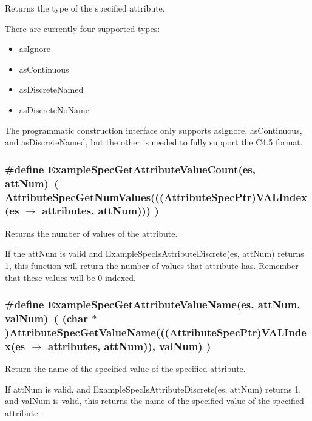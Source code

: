 Returns the type of the specified attribute. 

There are currently four supported types:\begin{itemize}
\item as\-Ignore\item as\-Continuous\item as\-Discrete\-Named\item as\-Discrete\-No\-Name\end{itemize}


The programmatic construction interface only supports as\-Ignore, as\-Continuous, and as\-Discrete\-Named, but the other is needed to fully support the C4.5 format. 
\subsubsection{\setlength{\rightskip}{0pt plus 5cm}\#define Example\-Spec\-Get\-Attribute\-Value\-Count(es, att\-Num)\ ( Attribute\-Spec\-Get\-Num\-Values(((Attribute\-Spec\-Ptr)VALIndex(es $\rightarrow$ attributes, att\-Num))) )}\label{ExampleSpec_8h_a4}


Returns the number of values of the attribute. 

If the att\-Num is valid and Example\-Spec\-Is\-Attribute\-Discrete(es, att\-Num) returns 1, this function will return the number of values that attribute has. Remember that these values will be 0 indexed. 
\subsubsection{\setlength{\rightskip}{0pt plus 5cm}\#define Example\-Spec\-Get\-Attribute\-Value\-Name(es, att\-Num, val\-Num)\ ( (char $\ast$)Attribute\-Spec\-Get\-Value\-Name(((Attribute\-Spec\-Ptr)VALIndex(es $\rightarrow$ attributes, att\-Num)), val\-Num) )}\label{ExampleSpec_8h_a5}


Return the name of the specified value of the specified attribute. 

If att\-Num is valid, and Example\-Spec\-Is\-Attribute\-Discrete(es, att\-Num) returns 1, and val\-Num is valid, this returns the name of the specified value of the specified attribute. 

